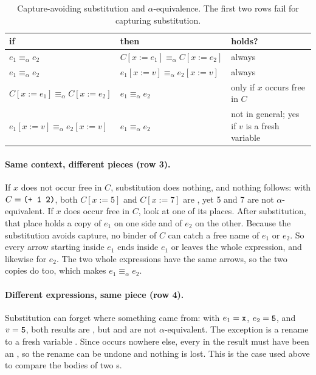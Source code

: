 \begin{table}[htbp]
\centering
\begin{tabular}{@{}lll@{}}
\toprule
if & then & holds? \\
\midrule
$e_1 \equiv_\alpha e_2$ & $C[x := e_1] \equiv_\alpha C[x := e_2]$ & always \\
$e_1 \equiv_\alpha e_2$ & $e_1[x := v] \equiv_\alpha e_2[x := v]$ & always \\
$C[x := e_1] \equiv_\alpha C[x := e_2]$ & $e_1 \equiv_\alpha e_2$ & only if $x$ occurs free in $C$ \\
$e_1[x := v] \equiv_\alpha e_2[x := v]$ & $e_1 \equiv_\alpha e_2$ & not in general; yes if $v$ is a fresh variable \\
\bottomrule
\end{tabular}
\caption{Capture-avoiding substitution and $\alpha$-equivalence. The first two rows fail for capturing substitution.}
\label{tab:substalpha}
\end{table}

\paragraph{Same context, different pieces (row 3).} If $x$ does not occur free in $C$, substitution does nothing, and nothing follows: with $C = \texttt{(+ 1 2)}$, both $C[x := 5]$ and $C[x := 7]$ are , yet 5 and 7 are not $\alpha$-equivalent. If $x$ does occur free in $C$, look at one of its places. After substitution, that place holds a copy of $e_1$ on one side and of $e_2$ on the other. Because the substitution avoids capture, no binder of $C$ can catch a free name of $e_1$ or $e_2$. So every arrow starting inside $e_1$ ends inside $e_1$ or leaves the whole expression, and likewise for $e_2$. The two whole expressions have the same arrows, so the two copies do too, which makes $e_1 \equiv_\alpha e_2$.

\paragraph{Different expressions, same piece (row 4).} Substitution can forget where something came from: with $e_1 = \texttt{x}$, $e_2 = \texttt{5}$, and $v = \texttt{5}$, both results are , but  and  are not $\alpha$-equivalent. The exception is a rename to a fresh variable . Since  occurs nowhere else, every  in the result must have been an , so the rename can be undone and nothing is lost. This is the case used above to compare the bodies of two s.

